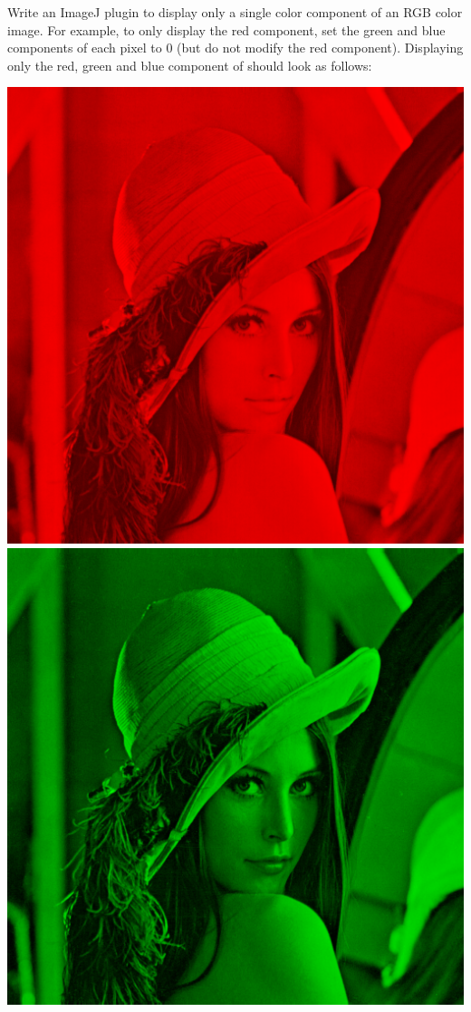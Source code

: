 \documentclass{book}
\begin{document}
\begin{exercise}
Write an ImageJ plugin to display only a single color component of an RGB color image. For example, to only display the red component, set the green and blue components of each pixel to 0 (but do not modify the red component). Displaying only the red, green and blue component of  should look as follows:
 
\begin{center}
\includegraphics[scale=0.2]{lena-onlyred.png}
\includegraphics[scale=0.2]{lena-onlygreen.png}

\end{center}
\end{exercise}
\end{document}
